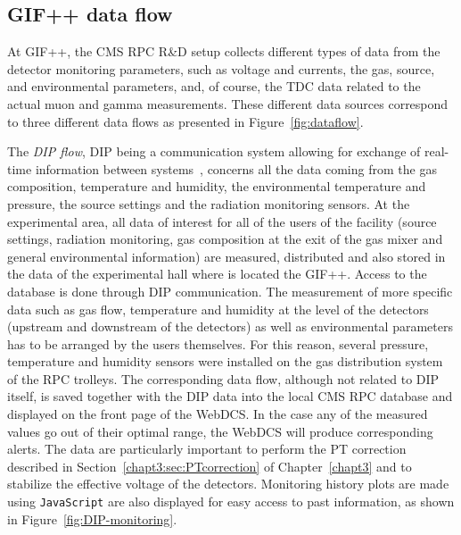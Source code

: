 	\subsection{GIF++ data flow}
	\label{chapt5:ssec:dataflow}
	
	At GIF++, the CMS RPC R\&D setup collects different types of data from the detector monitoring parameters, such as voltage and currents, the gas, source, and environmental parameters, and, of course, the TDC data related to the actual muon and gamma measurements. These different data sources correspond to three different data flows as presented in Figure~\ref{fig:dataflow}.
	
	The \textit{\acf{DIP} flow}, DIP being a communication system allowing for exchange of real-time information between systems~\cite{DIP}, concerns all the data coming from the gas composition, temperature and humidity, the environmental temperature and pressure, the source settings and the radiation monitoring sensors. At the experimental area, all data of interest for all of the users of the facility (source settings, radiation monitoring, gas composition at the exit of the gas mixer and general environmental information) are measured, distributed and also stored in the data of the experimental hall where is located the GIF++. Access to the database is done through DIP communication. The measurement of more specific data such as gas flow, temperature and humidity at the level of the detectors (upstream and downstream of the detectors) as well as environmental parameters has to be arranged by the users themselves. For this reason, several pressure, temperature and humidity sensors were installed on the gas distribution system of the RPC trolleys. The corresponding data flow, although not related to DIP itself, is saved together with the DIP data into the local CMS RPC database and displayed on the front page of the WebDCS. In the case any of the measured values go out of their optimal range, the WebDCS will produce corresponding alerts. The data are particularly important to perform the PT correction described in Section~\ref{chapt3:sec:PTcorrection} of Chapter~\ref{chapt3} and to stabilize the effective voltage of the detectors. Monitoring history plots are made using \texttt{JavaScript} are also displayed for easy access to past information, as shown in Figure~\ref{fig:DIP-monitoring}.
	
